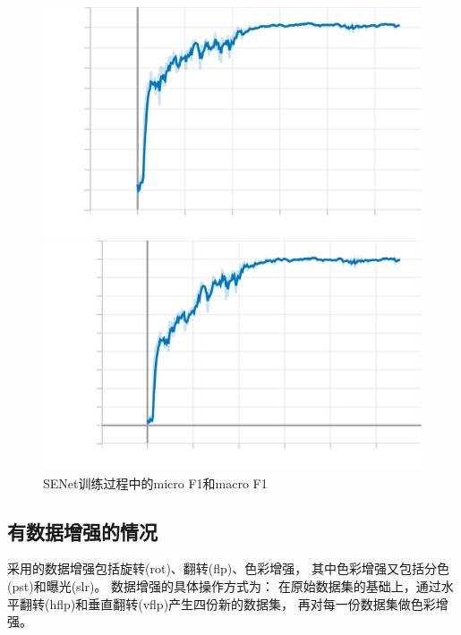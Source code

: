 \documentclass{article}
\begin{document}
\begin{figure}[H]
    \begin{minipage}[H]{0.5\linewidth}
        \centering
        \includegraphics[width=\textwidth]{figures/senet_noaug_microf1score_dev.png}
    \end{minipage}
    \begin{minipage}[H]{0.5\linewidth}
        \centering
        \includegraphics[width=\textwidth]{figures/senet_noaug_macrof1score_dev.png}
    \end{minipage}
    \caption{SENet训练过程中的micro F1和macro F1}
    \label{SENet-f1s}
\end{figure}

\subsection{有数据增强的情况}

采用的数据增强包括旋转(rot)、翻转(flp)、色彩增强，
其中色彩增强又包括分色(pst)和曝光(slr)。
数据增强的具体操作方式为：
在原始数据集的基础上，通过水平翻转(hflp)和垂直翻转(vflp)产生四份新的数据集，
再对每一份数据集做色彩增强。
\end{document}

